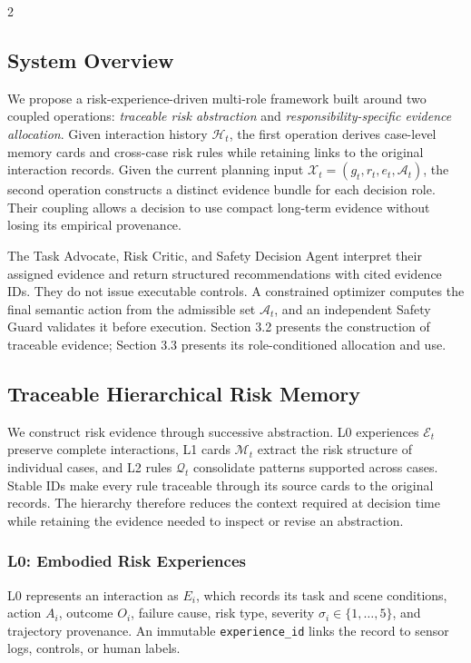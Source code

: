 \documentclass[10pt]{article}
\newcommand{\code}[1]{\texttt{#1}}
\begin{document}
\begin{multicols}{2}

\subsection{System Overview}

We propose a risk-experience-driven multi-role framework built around two coupled operations: \emph{traceable risk abstraction} and \emph{responsibility-specific evidence allocation}. Given interaction history $\mathcal{H}_t$, the first operation derives case-level memory cards and cross-case risk rules while retaining links to the original interaction records. Given the current planning input $\mathcal{X}_t=(g_t,r_t,e_t,\mathcal{A}_t)$, the second operation constructs a distinct evidence bundle for each decision role. Their coupling allows a decision to use compact long-term evidence without losing its empirical provenance.

The Task Advocate, Risk Critic, and Safety Decision Agent interpret their assigned evidence and return structured recommendations with cited evidence IDs. They do not issue executable controls. A constrained optimizer computes the final semantic action from the admissible set $\mathcal{A}_t$, and an independent Safety Guard validates it before execution. Section 3.2 presents the construction of traceable evidence; Section 3.3 presents its role-conditioned allocation and use.

\subsection{Traceable Hierarchical Risk Memory}

We construct risk evidence through successive abstraction. L0 experiences $\mathcal{E}_t$ preserve complete interactions, L1 cards $\mathcal{M}_t$ extract the risk structure of individual cases, and L2 rules $\mathcal{Q}_t$ consolidate patterns supported across cases. Stable IDs make every rule traceable through its source cards to the original records. The hierarchy therefore reduces the context required at decision time while retaining the evidence needed to inspect or revise an abstraction.

\subsubsection{L0: Embodied Risk Experiences}

L0 represents an interaction as $E_i$, which records its task and scene conditions, action $A_i$, outcome $O_i$, failure cause, risk type, severity $\sigma_i\in\{1,\ldots,5\}$, and trajectory provenance. An immutable \code{experience\_id} links the record to sensor logs, controls, or human labels.


\end{multicols}
\end{document}
